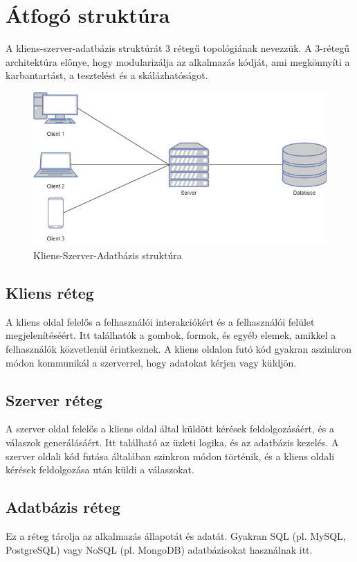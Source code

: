 \section{Átfogó struktúra}
A kliens-szerver-adatbázis struktúrát 3 rétegű topológiának nevezzük. A 3-rétegű architektúra előnye, hogy modularizálja az alkalmazás kódját, ami megkönnyíti a karbantartást, a tesztelést és a skálázhatóságot.
\begin{figure}[H]
    \centering
    \includegraphics[width=14.0truecm]{images/Client-Server-DB.png}
    \caption[Kliens-Szerver-Adatbázis struktúra]{Kliens-Szerver-Adatbázis struktúra}
    \label{fig:architecture}
\end{figure}
\subsection{Kliens réteg}
A kliens oldal felelős a felhasználói interakciókért és a felhasználói felület megjelenítéséért. Itt találhatók a gombok, formok, és egyéb elemek, amikkel a felhasználók közvetlenül érintkeznek. A kliens oldalon futó kód gyakran aszinkron módon kommunikál a szerverrel, hogy adatokat kérjen vagy küldjön.
\\
\subsection{Szerver réteg}
A szerver oldal felelős a kliens oldal által küldött kérések feldolgozásáért, és a válaszok generálásáért. Itt található az üzleti logika, és az adatbázis kezelés. A szerver oldali kód futása általában szinkron módon történik, és a kliens oldali kérések feldolgozása után küldi a válaszokat.

\subsection*{Adatbázis réteg}
Ez a réteg tárolja az alkalmazás állapotát és adatát. Gyakran SQL (pl. MySQL, PostgreSQL) vagy NoSQL (pl. MongoDB) adatbázisokat használnak itt.

